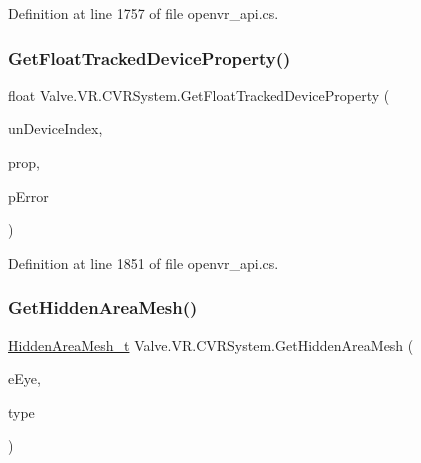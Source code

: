 Definition at line 1757 of file openvr\+\_\+api.\+cs.

\mbox{\label{class_valve_1_1_v_r_1_1_c_v_r_system_a6695017d8f8b2e6492fc003f7910a49e}} 
\subsubsection{\texorpdfstring{GetFloatTrackedDeviceProperty()}{GetFloatTrackedDeviceProperty()}}
{\footnotesize\ttfamily float Valve.\+V\+R.\+C\+V\+R\+System.\+Get\+Float\+Tracked\+Device\+Property (\begin{DoxyParamCaption}\item[{uint}]{un\+Device\+Index,  }\item[{\mbox{\hyperlink{namespace_valve_1_1_v_r_ab060521ead7273986988fc4897e52482}{E\+Tracked\+Device\+Property}}}]{prop,  }\item[{ref \mbox{\hyperlink{namespace_valve_1_1_v_r_aab6684f03930a2d2cf22ed66b437e47b}{E\+Tracked\+Property\+Error}}}]{p\+Error }\end{DoxyParamCaption})}



Definition at line 1851 of file openvr\+\_\+api.\+cs.

\mbox{\label{class_valve_1_1_v_r_1_1_c_v_r_system_a8fe7073e6d0c927bc986388a935a48ca}} 
\subsubsection{\texorpdfstring{GetHiddenAreaMesh()}{GetHiddenAreaMesh()}}
{\footnotesize\ttfamily \mbox{\hyperlink{struct_valve_1_1_v_r_1_1_hidden_area_mesh__t}{Hidden\+Area\+Mesh\+\_\+t}} Valve.\+V\+R.\+C\+V\+R\+System.\+Get\+Hidden\+Area\+Mesh (\begin{DoxyParamCaption}\item[{\mbox{\hyperlink{namespace_valve_1_1_v_r_a8153d4a3e627e1cede046327087c1880}{E\+V\+R\+Eye}}}]{e\+Eye,  }\item[{\mbox{\hyperlink{namespace_valve_1_1_v_r_a2ed1af4858f23bc73d7358e8fcde5c64}{E\+Hidden\+Area\+Mesh\+Type}}}]{type }\end{DoxyParamCaption})}



